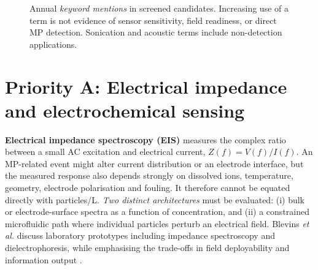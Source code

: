 \documentclass[10pt,a4paper]{article}
\begin{document}
\begin{figure}[H]\centering
{}
\caption{Annual \emph{keyword mentions} in screened candidates. Increasing use of a term is not evidence of sensor sensitivity, field readiness, or direct MP detection. Sonication and acoustic terms include non-detection applications.}
\label{fig:time}
\end{figure}

\section{Priority A: Electrical impedance and electrochemical sensing}
\textbf{Electrical impedance spectroscopy (EIS)} measures the complex ratio between a small AC excitation and electrical current, $Z(f)=V(f)/I(f)$. An MP-related event might alter current distribution or an electrode interface, but the measured response also depends strongly on dissolved ions, temperature, geometry, electrode polarisation and fouling. It therefore cannot be equated directly with particles/L. \emph{Two distinct architectures} must be evaluated: (i) bulk or electrode-surface spectra as a function of concentration, and (ii) a constrained microfluidic path where individual particles perturb an electrical field. Blevins \emph{et al.} discuss laboratory prototypes including impedance spectroscopy and dielectrophoresis, while emphasising the trade-offs in field deployability and information output \cite{Blevins2021}.
\end{document}
